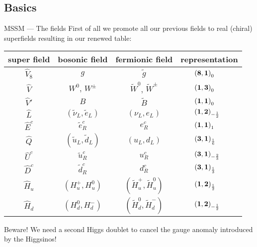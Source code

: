 \subsection{Basics}
\begin{frame}{MSSM — The fields}
First of all we promote all our previous fields to real (chiral) superfields resulting in our renewed table:\vfill
\begin{table}
\bgroup
\def\arraystretch{1.4}
\begin{tabular}{cccl}
  super field& bosonic field& fermionic field& representation\\\hline
  $\hat{V}_8$& $g$& $\tilde{g}$& $\quad\quad\left(\mathbf{8}, \mathbf{1}\right)_{0}$\\
  $\hat{V}$& $W^0$, $W^\pm$& $\tilde{W}^0$, $\tilde{W}^\pm$& $\quad\quad\left(\mathbf{1}, \mathbf{3}\right)_{0}$\\
  $\hat{V}'$& $B$& $\tilde{B}$& $\quad\quad\left(\mathbf{1}, \mathbf{1}\right)_{0}$\\
  $\hat{L}$& $(\tilde{\nu}_L, \tilde{e}_L)$& $(\nu_L, e_L)$& $\quad\quad\left(\mathbf{1}, \mathbf{2}\right)_{-\frac12}$\\
  $\hat{E}^c$& $\tilde{e}_R^c$& $e_R^c$& $\quad\quad\left(\mathbf{1}, \mathbf{1}\right)_{1}$\\
  $\hat{Q}$& $(\tilde{u}_L, \tilde{d}_L)$& $(u_L, d_L)$& $\quad\quad\left(\mathbf{3}, \mathbf{1}\right)_{\frac16}$\\
  $\hat{U}^c$& $\tilde{u}_R^c$& $u_R^c$& $\quad\quad\left(\mathbf{3}, \mathbf{1}\right)_{-\frac23}$\\
  $\hat{D}^c$& $\tilde{d}_R^c$& $d_R^c$& $\quad\quad\left(\mathbf{3}, \mathbf{1}\right)_{\frac13}$\\
  $\hat{H}_u$& $\left(H_u^+, H_u^0\right)$& $\left(\tilde{H}_u^+, \tilde{H}_u^0\right)$& $\quad\quad\left(\mathbf{1}, \mathbf{2}\right)_{\frac12}$\\
  $\hat{H}_d$& $(H_d^0, H_d^-)$& $(\tilde{H}^0_d, \tilde{H}_d^-)$& $\quad\quad\left(\mathbf{1}, \mathbf{2}\right)_{-\frac12}$
\end{tabular}
\egroup
\end{table}
\pause
\alert{Beware!} We need a second Higgs doublet to cancel the gauge anomaly introduced by the Higgsinos!
\end{frame}


